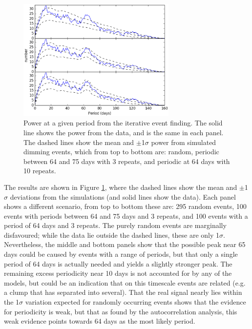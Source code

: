 \documentclass[]{rsos}
\begin{document}
\begin{figure}
  \begin{center}
    \hspace{-0.5cm} \includegraphics[width=0.7\textwidth]{figs/hist_single.ps}
    \caption{Power at a given period from the iterative event finding. The solid line
      shows the power from the data, and is the same in each panel. The dashed lines show
      the mean and $\pm$1$\sigma$ power from simulated dimming events, which from top to
      bottom are: random, periodic between 64 and 75 days with 3 repeats, and periodic at
      64 days with 10 repeats.}\label{fig:hist}
  \end{center}
\end{figure}

The results are shown in Figure \ref{fig:hist}, where the dashed lines show the mean and
$\pm$1$\sigma$ deviations from the simulations (and solid lines show the data). Each
panel shows a different scenario, from top to bottom these are: 295 random events, 100
events with periods between 64 and 75 days and 3 repeats, and 100 events with a period of
64 days and 3 repeats. The purely random events are marginally disfavoured; while the
data lie outside the dashed lines, these are only 1$\sigma$. Nevertheless, the middle and
bottom panels show that the possible peak near 65 days could be caused by events with a
range of periods, but that only a single period of 64 days is actually needed and yields
a slightly stronger peak. The remaining excess periodicity near 10 days is not accounted
for by any of the models, but could be an indication that on this timescale events are
related (e.g. a clump that has separated into several). That the real signal nearly lies
within the 1$\sigma$ variation expected for randomly occurring events shows that the
evidence for periodicity is weak, but that as found by the autocorrelation analysis, this
weak evidence points towards 64 days as the most likely period.
\end{document}

